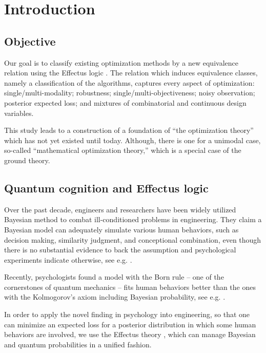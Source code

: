 \section{Introduction}

\subsection{Objective}
Our goal is to classify existing optimization methods by a new equivalence relation using the Effectus logic  \cite{Jacobs2015NewLogic}. The relation which induces equivalence classes, namely a classification of the algorithms, captures every aspect of optimization: single/multi-modality; robustness; single/multi-objectiveness; noisy observation; posterior expected loss; and mixtures of combinatorial and continuous design variables. 

This study leads to a construction of a foundation of ``the optimization theory'' which has not yet existed until today. Although, there is one for a unimodal case, so-called ``mathematical optimization theory,'' which is a special case of the ground theory.

\subsection{Quantum cognition and Effectus logic}
Over the past decade, engineers and researchers have been widely utilized Bayesian method to combat ill-conditioned problems in engineering.
They claim a Bayesian model can adequately simulate various human behaviors, such as decision making, similarity judgment, and conceptional combination, even though there is no substantial evidence to back the assumption and psychological experiments indicate otherwise, see e.g. \cite{Tversky1983ExtensionalJudgment}. 

Recently, psychologists found a model with the Born rule -- one of the cornerstones of quantum mechanics -- fits human behaviors better than the ones with the Kolmogorov's axiom including Bayesian probability, see e.g. \cite{Busemeyer2011AErrors, Pothos2013CanModeling, Denolf2017AGames}.

In order to apply the novel finding in psychology into engineering, so that one can minimize an expected loss for a posterior distribution in which some human behaviors are involved, we use the Effectus theory \cite{Jacobs2015NewLogic, Jacobs2017QuantumCognition}, which can manage Bayesian and quantum probabilities in a unified fashion.


